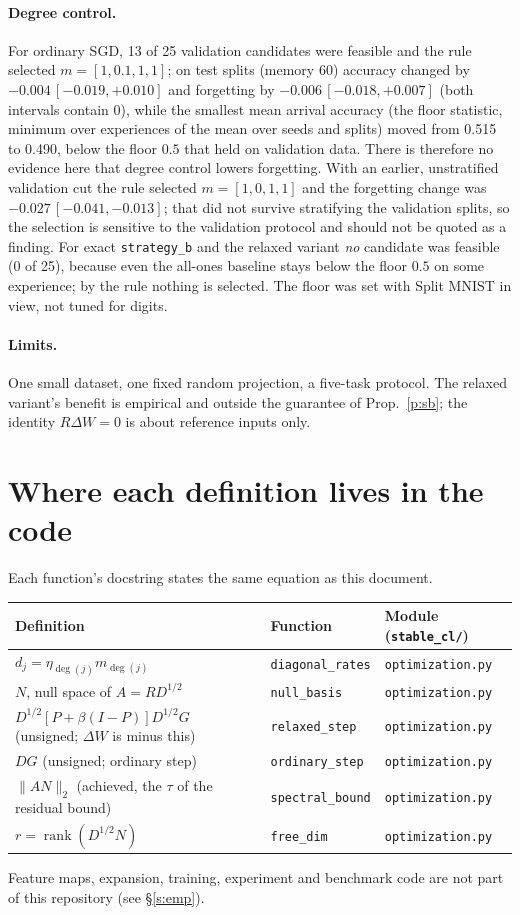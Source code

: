 \documentclass[11pt,a4paper]{article}
\theoremstyle{remark}\newtheorem*{rem}{Remark}
\DeclareMathOperator{\rank}{rank}
\begin{document}
\paragraph{Degree control.} For ordinary SGD, 13 of 25 validation candidates were feasible and the rule
selected $m=[1,0.1,1,1]$; on test splits (memory 60) accuracy changed by $-0.004\,[-0.019,+0.010]$ and
forgetting by $-0.006\,[-0.018,+0.007]$ (both intervals contain $0$), while the smallest mean arrival accuracy (the floor statistic, minimum over experiences of the mean over seeds and splits) moved from 0.515 to 0.490, below the floor $0.5$ that held on validation data. There is therefore no evidence here that degree control lowers forgetting. With an earlier, unstratified validation cut the rule selected $m=[1,0,1,1]$ and the forgetting change was $-0.027\,[-0.041,-0.013]$; that did not survive stratifying the validation splits, so the selection is sensitive to the validation protocol and should not be quoted as a finding. For exact \texttt{strategy\_b} and the relaxed
variant \emph{no} candidate was feasible (0 of 25), because even the all-ones baseline stays below the floor
$0.5$ on some experience; by the rule nothing is selected. The floor was set with Split MNIST in view, not
tuned for digits.

\paragraph{Limits.} One small dataset, one fixed random projection, a five-task protocol. The
relaxed variant's benefit is empirical and outside the guarantee of Prop.~\ref{p:sb}; the identity
$R\Delta W=0$ is about reference inputs only.

\section{Where each definition lives in the code}
Each function's docstring states the same equation as this document.
\begin{center}\small\begin{tabular}{@{}lll@{}}\toprule
Definition & Function & Module (\texttt{stable\_cl/})\\\midrule
$d_j=\eta_{\deg(j)}m_{\deg(j)}$ & \texttt{diagonal\_rates} & \texttt{optimization.py}\\
$N$, null space of $A=RD^{1/2}$ & \texttt{null\_basis} & \texttt{optimization.py}\\
$D^{1/2}[P+\beta(I-P)]D^{1/2}G$ (unsigned; $\Delta W$ is minus this) & \texttt{relaxed\_step} & \texttt{optimization.py}\\
$DG$ (unsigned; ordinary step) & \texttt{ordinary\_step} & \texttt{optimization.py}\\
$\|AN\|_2$ (achieved, the $\tau$ of the residual bound) & \texttt{spectral\_bound} & \texttt{optimization.py}\\
$r=\rank(D^{1/2}N)$ & \texttt{free\_dim} & \texttt{optimization.py}\\
\bottomrule\end{tabular}\end{center}
Feature maps, expansion, training, experiment and benchmark code are not part of this repository (see \S\ref{s:emp}).
\end{document}
